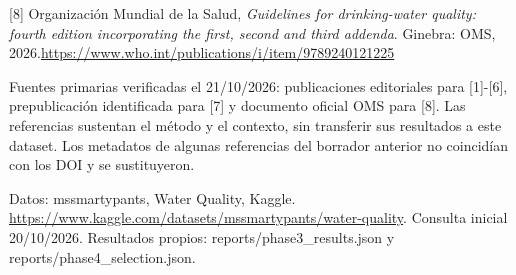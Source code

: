 \documentclass[12pt,a4paper]{article}
\begin{document}
[8] Organización Mundial de la Salud, \textit{Guidelines for drinking-water quality: fourth edition incorporating the first, second and third addenda}. Ginebra: OMS, 2026.\newline \url{https://www.who.int/publications/i/item/9789240121225}

Fuentes primarias verificadas el 21/10/2026: publicaciones editoriales para [1]-[6], prepublicación identificada para [7] y documento oficial OMS para [8]. Las referencias sustentan el método y el contexto, sin transferir sus resultados a este dataset. Los metadatos de algunas referencias del borrador anterior no coincidían con los DOI y se sustituyeron.

Datos: mssmartypants, Water Quality, Kaggle. \url{https://www.kaggle.com/datasets/mssmartypants/water-quality}. Consulta inicial 20/10/2026. Resultados propios: reports/phase3\_results.json y reports/phase4\_selection.json.
\end{document}

